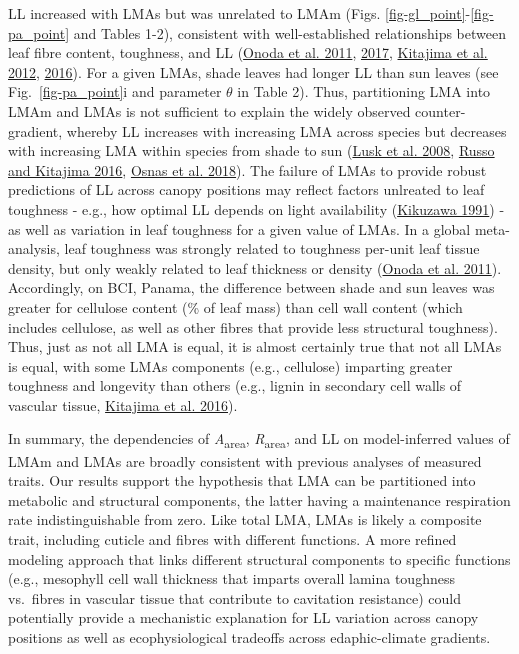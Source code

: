 \documentclass[
  12pt,
  letterpaper,
  DIV=11,
  numbers=noendperiod]{scrartcl}
\begin{document}
LL increased with LMAs but was unrelated to LMAm (Figs.
\ref{fig-gl_point}-\ref{fig-pa_point} and Tables 1-2), consistent with
well-established relationships between leaf fibre content, toughness,
and LL (\protect\hyperlink{ref-Onoda2011}{Onoda et al. 2011},
\protect\hyperlink{ref-Onoda2017}{2017},
\protect\hyperlink{ref-Kitajima2012}{Kitajima et al. 2012},
\protect\hyperlink{ref-Kitajima2016}{2016}). For a given LMAs, shade
leaves had longer LL than sun leaves (see Fig.~\ref{fig-pa_point}i and
parameter \(\theta\) in Table 2). Thus, partitioning LMA into LMAm and
LMAs is not sufficient to explain the widely observed counter-gradient,
whereby LL increases with increasing LMA across species but decreases
with increasing LMA within species from shade to sun
(\protect\hyperlink{ref-Lusk2008}{Lusk et al. 2008},
\protect\hyperlink{ref-Russo2016}{Russo and Kitajima 2016},
\protect\hyperlink{ref-Osnas2018}{Osnas et al. 2018}). The failure of
LMAs to provide robust predictions of LL across canopy positions may
reflect factors unlreated to leaf toughness - e.g., how optimal LL
depends on light availability
(\protect\hyperlink{ref-Kikuzawa1991}{Kikuzawa 1991}) - as well as
variation in leaf toughness for a given value of LMAs. In a global
meta-analysis, leaf toughness was strongly related to toughness per-unit
leaf tissue density, but only weakly related to leaf thickness or
density (\protect\hyperlink{ref-Onoda2011}{Onoda et al. 2011}).
Accordingly, on BCI, Panama, the difference between shade and sun leaves
was greater for cellulose content (\% of leaf mass) than cell wall
content (which includes cellulose, as well as other fibres that provide
less structural toughness). Thus, just as not all LMA is equal, it is
almost certainly true that not all LMAs is equal, with some LMAs
components (e.g., cellulose) imparting greater toughness and longevity
than others (e.g., lignin in secondary cell walls of vascular tissue,
\protect\hyperlink{ref-Kitajima2016}{Kitajima et al. 2016}).

In summary, the dependencies of \emph{A}\textsubscript{area},
\emph{R}\textsubscript{area}, and LL on model-inferred values of LMAm
and LMAs are broadly consistent with previous analyses of measured
traits. Our results support the hypothesis that LMA can be partitioned
into metabolic and structural components, the latter having a
maintenance respiration rate indistinguishable from zero. Like total
LMA, LMAs is likely a composite trait, including cuticle and fibres with
different functions. A more refined modeling approach that links
different structural components to specific functions (e.g., mesophyll
cell wall thickness that imparts overall lamina toughness vs.~fibres in
vascular tissue that contribute to cavitation resistance) could
potentially provide a mechanistic explanation for LL variation across
canopy positions as well as ecophysiological tradeoffs across
edaphic-climate gradients.
\end{document}
